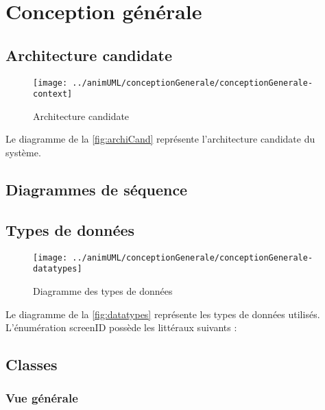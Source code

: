 
\section{Conception générale}

\newcommand\macroSuffix{}



\subsection{Architecture candidate}

\begin{figure}[H]
	\centering
	\texttt{[image: ../animUML/conceptionGenerale/conceptionGenerale-context]}
	\caption{Architecture candidate}
	\label{fig:archiCand}
\end{figure}
Le diagramme de la \autoref{fig:archiCand} représente l'architecture candidate du système.


\subsection{Diagrammes de séquence}


\subsection{Types de données}

\begin{figure}[H]
	\centering
	\texttt{[image: ../animUML/conceptionGenerale/conceptionGenerale-datatypes]}
	\caption{Diagramme des types de données}
	\label{fig:datatypes}
\end{figure}
Le diagramme de la \autoref{fig:datatypes} représente les types de données utilisés.
\newline
L'énumération screenID possède les littéraux suivants :
\enumscreenIDLiteralDescriptions

\subsection{Classes}

\subsubsection{Vue générale}

